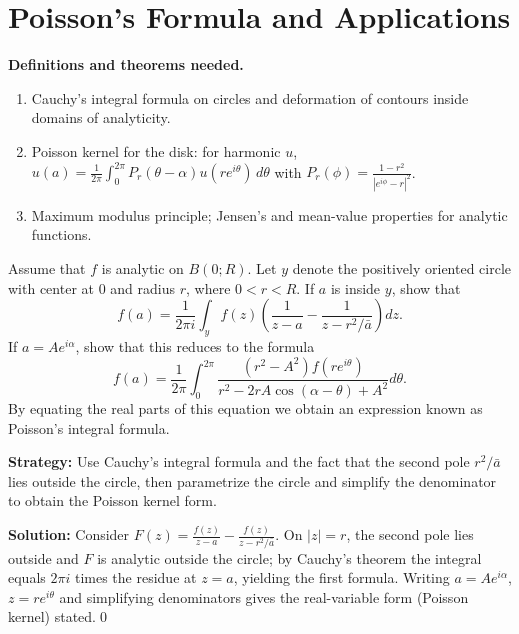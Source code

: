 \section{Poisson's Formula and Applications}

\noindent\textbf{Definitions and theorems needed.}
\begin{enumerate}[label=(\alph*)]
\item Cauchy's integral formula on circles and deformation of contours inside domains of analyticity.
\item Poisson kernel for the disk: for harmonic $u$, $u(a)=\frac{1}{2\pi}\int_0^{2\pi} P_r(\theta-\alpha)u(re^{i\theta})\,d\theta$ with $P_r(\phi)=\frac{1-r^2}{|e^{i\phi}-r|^2}$.
\item Maximum modulus principle; Jensen's and mean-value properties for analytic functions.
\end{enumerate}



\begin{problembox}
\begin{problemstatement}
Assume that \( f \) is analytic on \( B(0; R) \). Let \( y \) denote the positively oriented circle with center at 0 and radius \( r \), where \( 0 < r < R \). If \( a \) is inside \( y \), show that
\[f(a) = \frac{1}{2\pi i} \int_{y} f(z) \left( \frac{1}{z - a} - \frac{1}{z - r^2 / \bar{a}} \right) dz.\]
If \( a = Ae^{i\alpha} \), show that this reduces to the formula
\[f(a) = \frac{1}{2\pi} \int_0^{2\pi} \frac{(r^2 - A^2)f(re^{i\theta})}{r^2 - 2rA \cos (\alpha - \theta) + A^2} d\theta.\]
By equating the real parts of this equation we obtain an expression known as Poisson's integral formula.
\end{problemstatement}
\end{problembox}

\noindent\textbf{Strategy:} Use Cauchy's integral formula and the fact that the second pole \( r^2/\bar{a} \) lies outside the circle, then parametrize the circle and simplify the denominator to obtain the Poisson kernel form.

\bigskip\noindent\textbf{Solution:}
Consider $F(z)=\frac{f(z)}{z-a}-\frac{f(z)}{z-r^2/\bar a}$. On $|z|=r$, the second pole lies outside and $F$ is analytic outside the circle; by Cauchy's theorem the integral equals $2\pi i$ times the residue at $z=a$, yielding the first formula. Writing $a=Ae^{i\alpha}$, $z=re^{i\theta}$ and simplifying denominators gives the real-variable form (Poisson kernel) stated.\qed


